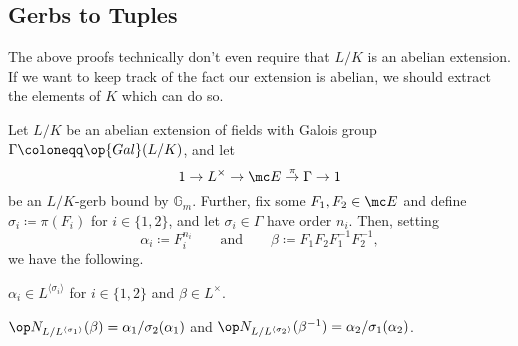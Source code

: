 \documentclass{article}
\numberwithin{equation}{section}
\begin{document}
\subsection{Gerbs to Tuples}
The above proofs technically don't even require that $L/K$ is an abelian extension. If we want to keep track of the fact our extension is abelian, we should extract the elements of $K$ which can do so.
\begin{lemma} \label{lem:constructalphabeta}
	Let $L/K$ be an abelian extension of fields with Galois group $\Gamma\coloneqq\op{Gal}(L/K)$, and let 
	\[1\to L^\times\to\mc E\stackrel\pi\to\Gamma\to1\]
	be an $L/K$-gerb bound by $\mathbb G_m$. Further, fix some $F_1,F_2\in\mc E$ and define $\sigma_i\coloneqq\pi(F_i)$ for $i\in\{1,2\}$, and let $\sigma_i\in\Gamma$ have order $n_i$. Then, setting
	\[\alpha_i\coloneqq F_i^{n_i}\qquad\text{and}\qquad\beta\coloneqq F_1F_2F_1^{-1}F_2^{-1},\]
	we have the following.
	\begin{listalph}
		\item $\alpha_i\in L^{\langle\sigma_i\rangle}$ for $i\in\{1,2\}$ and $\beta\in L^\times$.
		\item $\op N_{L/L^{\langle\sigma_1\rangle}}(\beta)=\alpha_1/\sigma_2(\alpha_1)$ and $\op N_{L/L^{\langle\sigma_2\rangle}}(\beta^{-1})=\alpha_2/\sigma_1(\alpha_2)$.
	\end{listalph}
\end{lemma}
\end{document}
